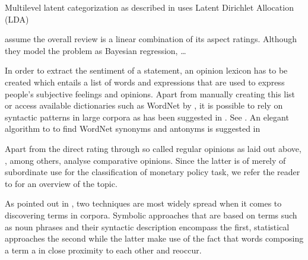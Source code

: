 
Multilevel latent categorization as described in \textcite{Guo.2009} uses Latent Dirichlet Allocation (LDA) 


\textcite{Wang.2010} assume the overall review is a linear combination of its aspect ratings. Although they model the problem as Bayesian regression, \dots %

In order to extract the sentiment of a statement, an opinion lexicon has to be created which entails a list of words and expressions that are used to express people's subjective feelings and opinions. Apart from manually creating this list or access available dictionaries such as WordNet\textsuperscript{\textregistered} by \textcite{Fellbaum.1998,Esuli.2006}, it is possible to rely on syntactic patterns in large corpora as has been suggested in \textcite{Ding.2008,Hatzivassiloglou.1997,Kanayama.2006,Turney.2002,Yu.2003}. See \textcite{Feldman.2013}. An elegant algorithm to to find WordNet\textsuperscript{\textregistered} synonyms and antonyms is suggested in \textcite{Kamps.2004} %

Apart from the direct rating through so called regular opinions as laid out above, \textcite{Ding.2009,Ganapathibhotla.2008,Jindal.2006}, among others, analyse comparative opinions. Since the latter is of merely of subordinate use for the classification of monetary policy task, we refer the reader to \textcite{Liu.2012} for an overview of the topic. 

%
As pointed out in \textcite{Hu.2004}, two techniques are most widely spread when it comes to discovering terms in corpora. Symbolic approaches that are based on terms such as noun phrases and their syntactic description encompass the first, statistical approaches the second while the latter make use of the fact that words composing a term a in close proximity to each other and reoccur. 


